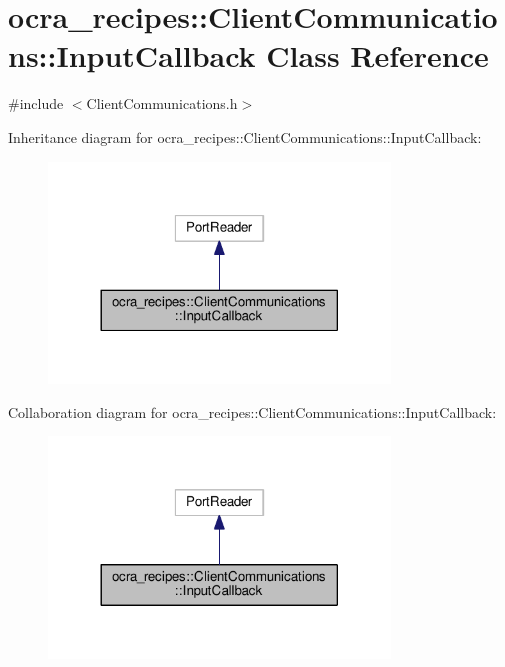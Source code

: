 \hypertarget{classocra__recipes_1_1ClientCommunications_1_1InputCallback}{}\section{ocra\+\_\+recipes\+:\+:Client\+Communications\+:\+:Input\+Callback Class Reference}
\label{classocra__recipes_1_1ClientCommunications_1_1InputCallback}


{\ttfamily \#include $<$Client\+Communications.\+h$>$}



Inheritance diagram for ocra\+\_\+recipes\+:\+:Client\+Communications\+:\+:Input\+Callback\+:
\nopagebreak
\begin{figure}[H]
\begin{center}
\leavevmode
\includegraphics[width=257pt]{d7/daf/classocra__recipes_1_1ClientCommunications_1_1InputCallback__inherit__graph}
\end{center}
\end{figure}


Collaboration diagram for ocra\+\_\+recipes\+:\+:Client\+Communications\+:\+:Input\+Callback\+:
\nopagebreak
\begin{figure}[H]
\begin{center}
\leavevmode
\includegraphics[width=257pt]{dd/d35/classocra__recipes_1_1ClientCommunications_1_1InputCallback__coll__graph}
\end{center}
\end{figure}
